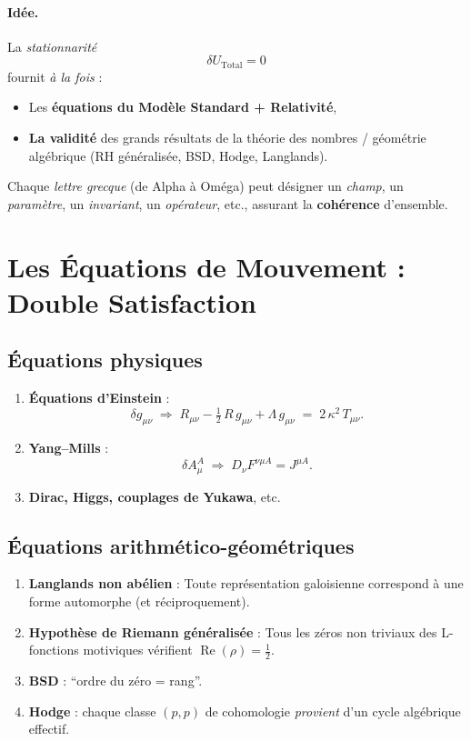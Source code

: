 \documentclass[11pt]{article}
\begin{document}
\medskip

\paragraph{Idée.}
La \emph{stationnarité} 
\[
\delta U_{\mathrm{Total}}=0
\]
fournit \emph{à la fois} :
\begin{itemize}
  \item Les \textbf{équations du Modèle Standard + Relativité}, 
  \item \textbf{La validité} des grands résultats de la théorie des nombres / géométrie algébrique (RH généralisée, BSD, Hodge, Langlands).
\end{itemize}
Chaque \emph{lettre grecque} (de Alpha à Oméga) peut désigner un \emph{champ}, un \emph{paramètre}, un \emph{invariant}, un \emph{opérateur}, etc., assurant la \textbf{cohérence} d'ensemble.

\section{Les Équations de Mouvement : Double Satisfaction}

\subsection{Équations physiques}

\begin{enumerate}
  \item \textbf{Équations d'Einstein} :
  \[
    \delta g_{\mu\nu} \;\Rightarrow\; 
    R_{\mu\nu}-\tfrac12\,R\,g_{\mu\nu} + \Lambda\,g_{\mu\nu} \;=\; 2\,\kappa^2\,T_{\mu\nu}.
  \]
  \item \textbf{Yang--Mills} : 
  \[
    \delta A_\mu^A \;\Rightarrow\; D_\nu F^{\nu\mu A} = J^{\mu A}.
  \]
  \item \textbf{Dirac, Higgs, couplages de Yukawa}, etc.
\end{enumerate}

\subsection{Équations arithmético-géométriques}

\begin{enumerate}
  \item \textbf{Langlands non abélien} : Toute représentation galoisienne correspond à une forme automorphe (et réciproquement).
  \item \textbf{Hypothèse de Riemann généralisée} : Tous les zéros non triviaux des L-fonctions motiviques vérifient $\operatorname{Re}(\rho)=\tfrac12$.
  \item \textbf{BSD} : “ordre du zéro = rang”.
  \item \textbf{Hodge} : chaque classe \((p,p)\) de cohomologie \emph{provient} d'un cycle algébrique effectif.
\end{enumerate}
\end{document}
